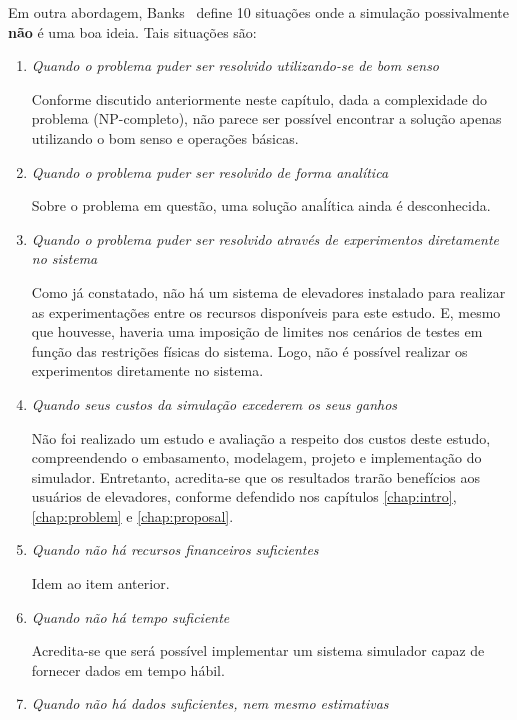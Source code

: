Em outra abordagem, Banks~\cite{BanksGibson} define 10 situações onde a
simulação possivalmente \textbf{não} é uma boa ideia. Tais situações são:

\begin{enumerate}
\item \textit{Quando o problema puder ser resolvido utilizando-se de bom senso}

Conforme discutido anteriormente neste capítulo, dada a complexidade do problema
(NP-completo), não parece ser possível encontrar a solução apenas utilizando o
bom senso e operações básicas.

\item \textit{Quando o problema puder ser resolvido de forma analítica}

Sobre o problema em questão, uma solução anaĺítica ainda é desconhecida.

\item \textit{Quando o problema puder ser resolvido através de experimentos
diretamente no sistema}

Como já constatado, não há um sistema de elevadores instalado para realizar as
experimentações entre os recursos disponíveis para este estudo. E, mesmo que
houvesse, haveria uma imposição de limites nos cenários de testes em função das
restrições físicas do sistema. Logo, não é possível realizar os experimentos
diretamente no sistema.

\item \textit{Quando seus custos da simulação excederem os seus ganhos}

Não foi realizado um estudo e avaliação a respeito dos custos deste estudo,
compreendendo o embasamento, modelagem, projeto e implementação do simulador.
Entretanto, acredita-se que os resultados trarão benefícios aos usuários de
elevadores, conforme defendido nos capítulos \ref{chap:intro},
\ref{chap:problem} e \ref{chap:proposal}.

\item \textit{Quando não há recursos financeiros suficientes}

Idem ao item anterior.

\item \textit{Quando não há tempo suficiente}

Acredita-se que
será possível implementar um sistema simulador capaz de fornecer dados em tempo
hábil.

\item \textit{Quando não há dados suficientes, nem mesmo estimativas}


\end{enumerate}

